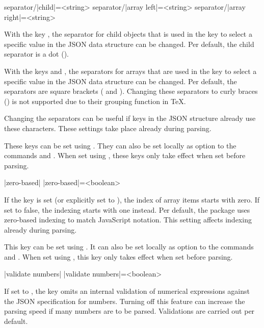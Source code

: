 \documentclass[a4paper]{article}
\begin{document}
{{\begin{macrodef}
separator/|child|={<string>}
separator/|array left|={<string>}
separator/|array right|={<string>}
\end{macrodef}
With the key , the separator for child objects that is used in the key to select a specific value in the JSON data structure can be changed. Per default, the child separator is a dot ().

With the keys  and , the separators for arrays that are used in the key to select a specific value in the JSON data structure can be changed. Per default, the separators are square brackets (\macro{[} and \macro{]}). Changing these separators to curly braces (\macro{{}}) is not supported due to their grouping function in TeX.

Changing the separators can be useful if keys in the JSON structure already use these characters. These settings take place already during parsing.

These keys can be set using \macro{\JSONParseSet}. They can also be set locally as option to the commands \macro{\JSONParse} and \macro{\JSONParseFromFile}. When set using \macro{\JSONParseSet}, these keys only take effect when set before parsing.

\begin{macrodef}
|zero-based|
|zero-based|={<boolean>}
\end{macrodef}
If the key  is set (or explicitly set to ), the index of array items starts with zero. If set to false, the indexing starts with one instead. Per default, the package uses zero-based indexing to match JavaScript notation. This setting affects indexing already during parsing.

This key can be set using \macro{\JSONParseSet}. It can also be set locally as option to the commands \macro{\JSONParse} and \macro{\JSONParseFromFile}. When set using \macro{\JSONParseSet}, this key only takes effect when set before parsing.

\begin{macrodef}
|validate numbers|
|validate numbers|={<boolean>}
\end{macrodef}
If set to , the key  omits an internal validation of numerical expressions against the JSON specification for numbers. Turning off this feature can increase the parsing speed if many numbers are to be parsed. Validations are carried out per default.

}}
\end{document}
